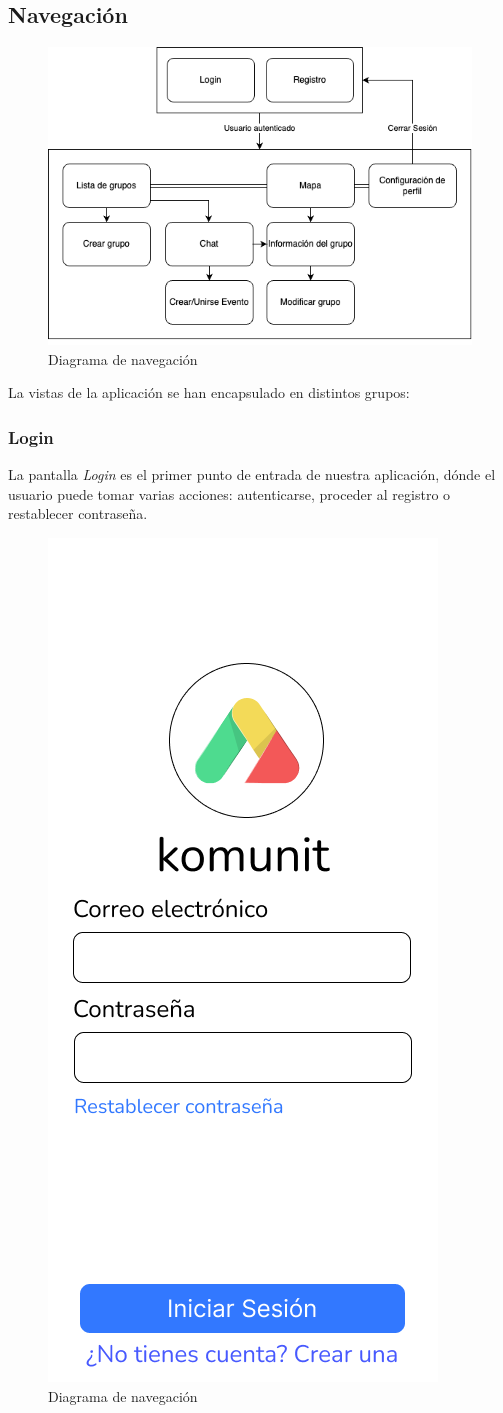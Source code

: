 \subsection{Navegación}
\begin{figure}[H]
        \centering
        \includegraphics[width=1\linewidth]{images/diagramaNavegacion (1).png}
        \caption{Diagrama de navegación}
        \label{fig:diagramaER}
\end{figure}
La vistas de la aplicación se han encapsulado en distintos grupos:

\subsubsection{Login}
La pantalla \textit{Login} es el primer punto de entrada de nuestra aplicación, dónde el usuario puede tomar varias acciones: autenticarse, proceder al registro o restablecer contraseña.

\begin{figure}[H]
        \centering
        \includegraphics[cframe=black 2pt,width=0.3\linewidth]{images/vistas/Login.png}
        \caption{Diagrama de navegación}
        \label{fig:Vista Login}
\end{figure}

